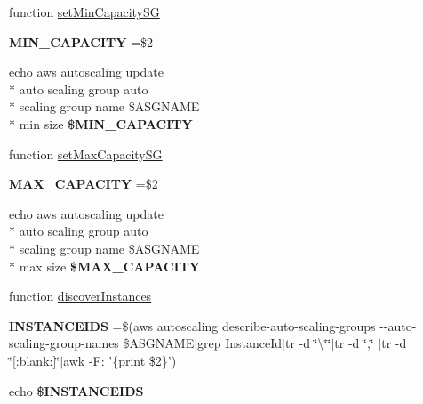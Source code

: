 \begin{DoxyCompactItemize}
\item 
function \hyperlink{aws-toolkit_8bash_ae9ec87d9f33408c7b684b01e7f892422}{set\-Min\-Capacity\-S\-G}
\item 
\hypertarget{aws-toolkit_8bash_a822c72c7d036c925599ce796580c9a44}{{\bfseries M\-I\-N\-\_\-\-C\-A\-P\-A\-C\-I\-T\-Y} =\$2}\label{aws-toolkit_8bash_a822c72c7d036c925599ce796580c9a44}

\item 
\hypertarget{aws-toolkit_8bash_ac02055c0f61670f7f5e6e81381c8ebb2}{echo aws autoscaling update \\*
auto scaling group auto \\*
scaling group name \$A\-S\-G\-N\-A\-M\-E \\*
min size {\bfseries \$\-M\-I\-N\-\_\-\-C\-A\-P\-A\-C\-I\-T\-Y}}\label{aws-toolkit_8bash_ac02055c0f61670f7f5e6e81381c8ebb2}

\item 
function \hyperlink{aws-toolkit_8bash_a89448d97f12c5799505c31c8211aa664}{set\-Max\-Capacity\-S\-G}
\item 
\hypertarget{aws-toolkit_8bash_ab418faf8fad53961168df520e73a13b5}{{\bfseries M\-A\-X\-\_\-\-C\-A\-P\-A\-C\-I\-T\-Y} =\$2}\label{aws-toolkit_8bash_ab418faf8fad53961168df520e73a13b5}

\item 
\hypertarget{aws-toolkit_8bash_a11448ae2147e2f71676f77745c0e123b}{echo aws autoscaling update \\*
auto scaling group auto \\*
scaling group name \$A\-S\-G\-N\-A\-M\-E \\*
max size {\bfseries \$\-M\-A\-X\-\_\-\-C\-A\-P\-A\-C\-I\-T\-Y}}\label{aws-toolkit_8bash_a11448ae2147e2f71676f77745c0e123b}

\item 
function \hyperlink{aws-toolkit_8bash_aa4f4a4f3ee2fcb808a5929a07b047987}{discover\-Instances}
\item 
\hypertarget{aws-toolkit_8bash_a6bb9eed40fd7cfebd096888ab28b9b35}{{\bfseries I\-N\-S\-T\-A\-N\-C\-E\-I\-D\-S} =\$(aws autoscaling describe-\/auto-\/scaling-\/groups -\/-\/auto-\/scaling-\/group-\/names \$A\-S\-G\-N\-A\-M\-E$\vert$grep Instance\-Id$\vert$tr -\/d \char`\"{}\textbackslash{}\char`\"{}\char`\"{}$\vert$tr -\/d \char`\"{},\char`\"{} $\vert$tr -\/d \char`\"{}\mbox{[}\-:blank\-:\mbox{]}\char`\"{}$\vert$awk -\/F\-: '\{print \$2\}')}\label{aws-toolkit_8bash_a6bb9eed40fd7cfebd096888ab28b9b35}

\item 
\hypertarget{aws-toolkit_8bash_ad724841b486cc66f75b6d7e1f6ea08ee}{echo {\bfseries \$\-I\-N\-S\-T\-A\-N\-C\-E\-I\-D\-S}}\label{aws-toolkit_8bash_ad724841b486cc66f75b6d7e1f6ea08ee}


\end{DoxyCompactItemize}
